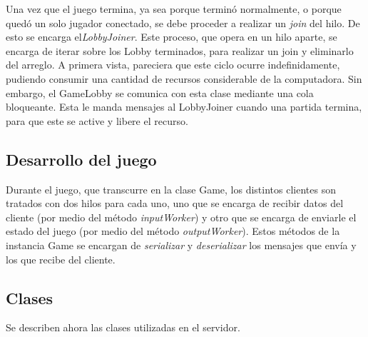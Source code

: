 \indent Una vez que el juego termina, ya sea porque terminó normalmente, o porque quedó un solo jugador conectado, se debe proceder a realizar un \emph{join} del hilo. De esto se encarga el\emph{LobbyJoiner}. Este proceso, que opera en un hilo aparte, se encarga de iterar sobre los Lobby terminados, para realizar un join y eliminarlo del arreglo. A primera vista, pareciera que este ciclo ocurre indefinidamente, pudiendo consumir una cantidad de recursos considerable de la computadora. Sin embargo, el GameLobby se comunica con esta clase mediante una cola bloqueante. Esta le manda mensajes al LobbyJoiner cuando una partida termina, para que este se active y libere el recurso.

\subsection{Desarrollo del juego}
Durante el juego, que transcurre en la clase Game, los distintos clientes son tratados con dos hilos para cada uno, uno que se encarga de recibir datos del cliente (por medio del método \emph{inputWorker}) y otro que se encarga de enviarle el estado del juego (por medio del método \emph{outputWorker}). Estos métodos de la instancia Game se encargan de \emph{serializar} y \emph{deserializar} los mensajes que envía y los que recibe del cliente.

\subsection{Clases}

Se describen ahora las clases utilizadas en el servidor.

